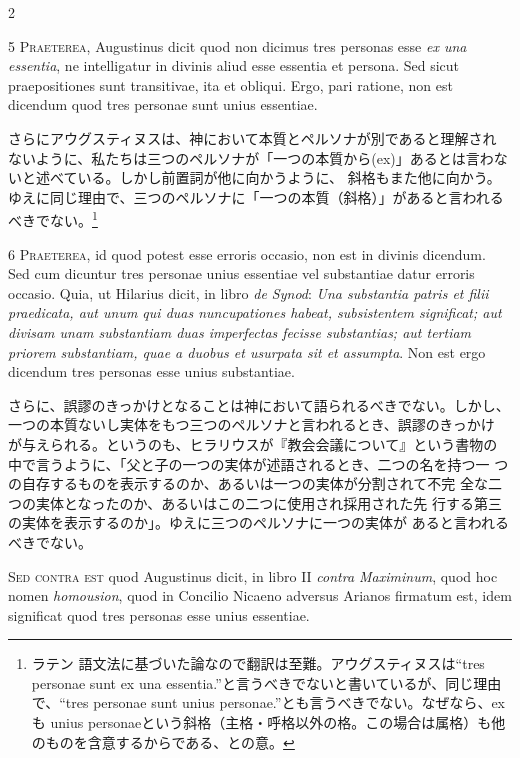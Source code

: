 \documentclass[paper=a4paper,fontsize=10pt,jafontsize=9pt,titlepage]{jlreq}
\begin{document}
\begin{paracol}{2}
\switchcolumn*

5 {\scshape Praeterea}, Augustinus dicit quod non dicimus tres personas esse {\itshape ex una
essentia}, ne intelligatur in divinis aliud esse essentia et persona. Sed
sicut praepositiones sunt transitivae, ita et obliqui. Ergo, pari
ratione, non est dicendum quod tres personae sunt unius essentiae.

\switchcolumn

さらにアウグスティヌスは、神において本質とペルソナが別であると理解され
 ないように、私たちは三つのペルソナが「一つの本質から(ex)」あるとは言わないと述べている。しかし前置詞が他に向かうように、
 斜格もまた他に向かう。ゆえに同じ理由で、三つのペルソナに「一つの本質（斜格）」があると言われるべきでない。\footnote{ラテン
 語文法に基づいた論なので翻訳は至難。アウグスティヌスは``tres personae sunt ex una
 essentia.''と言うべきでないと書いているが、同じ理由で、``tres
 personae sunt unius personae.''とも言うべきでない。なぜなら、exも
 unius personaeという斜格（主格・呼格以外の格。この場合は属格）も他のものを含意するからである、との意。 }

\switchcolumn*

6 {\scshape Praeterea}, id quod potest esse erroris occasio, non est in divinis
dicendum. Sed cum dicuntur tres personae unius essentiae vel substantiae
datur erroris occasio. Quia, ut Hilarius dicit, in libro {\itshape de Synod}: {\itshape Una
substantia patris et filii praedicata, aut unum qui duas nuncupationes
habeat, subsistentem significat; aut divisam unam substantiam duas
imperfectas fecisse substantias; aut tertiam priorem substantiam, quae a
duobus et usurpata sit et assumpta}. Non est ergo dicendum tres personas
esse unius substantiae.

\switchcolumn

さらに、誤謬のきっかけとなることは神において語られるべきでない。しかし、
 一つの本質ないし実体をもつ三つのペルソナと言われるとき、誤謬のきっかけ
 が与えられる。というのも、ヒラリウスが『教会会議について』という書物の
 中で言うように、「父と子の一つの実体が述語されるとき、二つの名を持つ一
 つの自存するものを表示するのか、あるいは一つの実体が分割されて不完
 全な二つの実体となったのか、あるいはこの二つに使用され採用された先
 行する第三の実体を表示するのか」。ゆえに三つのペルソナに一つの実体が
 あると言われるべきでない。

\switchcolumn*

{\scshape Sed contra est} quod Augustinus dicit, in libro II {\itshape contra Maximinum}, quod
hoc nomen {\itshape homousion}, quod in Concilio Nicaeno adversus Arianos firmatum
est, idem significat quod tres personas esse unius essentiae.


\end{paracol}
\end{document}
